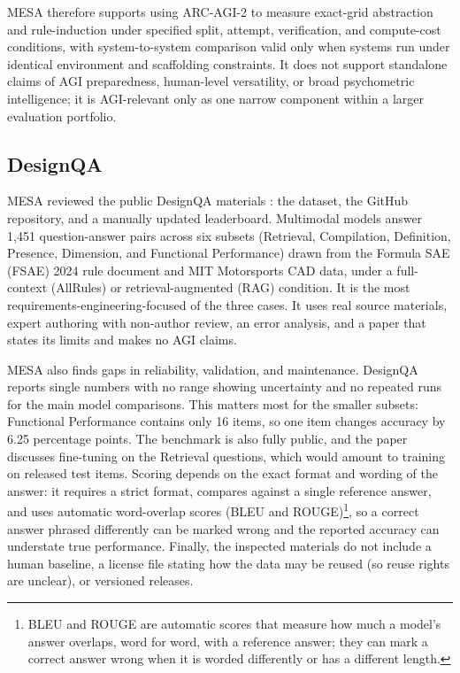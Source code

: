 \documentclass[conference]{IEEEtran}
\begin{document}
        MESA therefore supports using ARC-AGI-2 to measure exact-grid abstraction and rule-induction under specified split, attempt, verification, and compute-cost conditions, with system-to-system comparison valid only when systems run under identical environment and scaffolding constraints. It does not support standalone claims of AGI preparedness, human-level versatility, or broad psychometric intelligence; it is AGI-relevant only as one narrow component within a larger evaluation portfolio.
        
    \subsection{DesignQA}

        MESA reviewed the public DesignQA materials \cite{doris_designqa_2024}: the dataset, the GitHub repository, and a manually updated leaderboard. Multimodal models answer 1,451 question-answer pairs across six subsets (Retrieval, Compilation, Definition, Presence, Dimension, and Functional Performance) drawn from the Formula SAE (FSAE) 2024 rule document and MIT Motorsports CAD data, under a full-context (AllRules) or retrieval-augmented (RAG) condition. It is the most requirements-engineering-focused of the three cases. It uses real source materials, expert authoring with non-author review, an error analysis, and a paper that states its limits and makes no AGI claims.

        MESA also finds gaps in reliability, validation, and maintenance. DesignQA reports single numbers with no range showing uncertainty and no repeated runs for the main model comparisons. This matters most for the smaller subsets: Functional Performance contains only 16 items, so one item changes accuracy by 6.25 percentage points. The benchmark is also fully public, and the paper discusses fine-tuning on the Retrieval questions, which would amount to training on released test items. Scoring depends on the exact format and wording of the answer: it requires a strict format, compares against a single reference answer, and uses automatic word-overlap scores (BLEU and ROUGE)\footnote{BLEU and ROUGE are automatic scores that measure how much a model's answer overlaps, word for word, with a reference answer; they can mark a correct answer wrong when it is worded differently or has a different length.}, so a correct answer phrased differently can be marked wrong and the reported accuracy can understate true performance. Finally, the inspected materials do not include a human baseline, a license file stating how the data may be reused (so reuse rights are unclear), or versioned releases.
\end{document}
